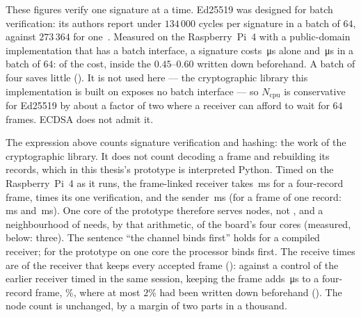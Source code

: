 These figures verify one signature at a time. Ed25519 was designed for batch verification: its
authors report under $134\,000$ cycles per signature in a batch of $64$, against $273\,364$ for
one~\cite{ed25519}. Measured on the Raspberry~Pi~4 with a public-domain implementation that has
a batch interface, a signature costs \edBatchOneUs\,\si{\micro\second} alone and
\edBatchManyUs\,\si{\micro\second} in a batch of $64$: \edBatchRatio{} of the cost, inside
the $0.45$--$0.60$ written down beforehand. A batch of four saves little (\edBatchFourRatio).
It is not used here --- the cryptographic library this implementation is built on exposes no
batch interface --- so $N_{\mathrm{cpu}}$ is conservative for Ed25519 by about a factor of two
where a receiver can afford to wait for $64$ frames. ECDSA does not admit it.

\begin{remark}
The expression above counts signature verification and hashing: the work of the cryptographic
library. It does not count decoding a frame and rebuilding its records, which in this thesis's
prototype is interpreted Python. Timed on the Raspberry~Pi~4 as it runs, the frame-linked receiver takes
\leanRecvMs\,ms for a four-record frame, \leanRecvOverVerify{} times its one verification, and
the sender \leanSendMs\,ms (for a frame of one record: \leanRecvOneMs\,ms and
\leanSendOneMs\,ms). One core of the prototype therefore serves \ncpuProto{} nodes,
not \ncpuBatch, and a neighbourhood of \nmaxLeanDesign{} needs, by that arithmetic,
\cpuProtoCores{} of the board's four cores (measured, below: three). The sentence ``the channel binds first'' holds for a compiled receiver; for the
prototype on one core the processor binds first. The receive times are of the receiver that
keeps every accepted frame (): against a control of the earlier receiver timed
in the same session, keeping the frame adds \leanRecvKeepUs\,\si{\micro\second} to a
four-record frame, \leanRecvKeepPct\%, where at most $2\%$ had been written down beforehand
(). The node count is unchanged, by a margin of two parts in a thousand.


\end{remark}
